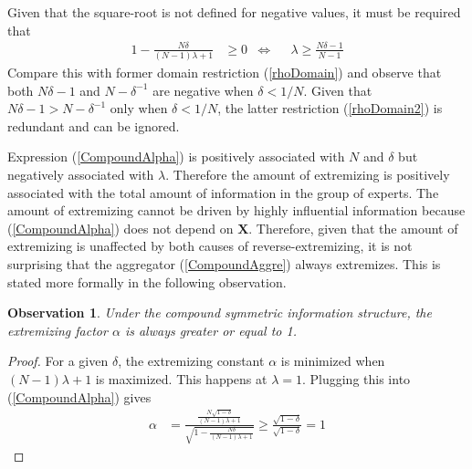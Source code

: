 \documentclass[11pt]{article}
\newtheorem{observation}[theorem]{Observation}
\theoremstyle{definition}
\theoremstyle{definition}
\begin{document}
Given that the square-root is not defined for negative values,  it must be required that
\begin{align}
1- \frac{N\delta}{(N-1)\lambda +1}  &\geq 0 &\Leftrightarrow&& \lambda \geq \frac{N\delta - 1}{N-1} \label{rhoDomain2}
\end{align}
Compare this with former domain restriction (\ref{rhoDomain}) and observe that both $N\delta - 1$ and $N - \delta^{-1}$ are negative when $\delta < 1/N$. Given that $N\delta - 1 > N - \delta^{-1}$ only when $\delta < 1/N$, the latter restriction (\ref{rhoDomain2}) is redundant and can be ignored. 

Expression (\ref{CompoundAlpha}) is positively associated with $N$ and $\delta$ but negatively associated with $\lambda$. Therefore the amount of extremizing is positively associated with the total amount of information in the group of experts. The amount of extremizing cannot be driven by highly influential information because (\ref{CompoundAlpha}) does not depend on $\boldsymbol{X}$. Therefore, given that the amount of extremizing is unaffected by both causes of reverse-extremizing, it is not surprising that the aggregator (\ref{CompoundAggre}) always extremizes. This is stated more formally in the following observation.

\begin{observation}
\label{positiveThm}
Under the compound symmetric information structure, the extremizing factor $\alpha$ is always greater or equal to 1. 
\end{observation}
\begin{proof} 
For a given $\delta$, the extremizing constant $\alpha$ is minimized when $(N-1)\lambda +1$ is maximized. This happens at $\lambda = 1$. Plugging this into (\ref{CompoundAlpha}) gives
\begin{align*}
\alpha &= \frac{\frac{N\sqrt{1-\delta}}{(N-1)\lambda +1}}{\sqrt{1- \frac{N\delta}{(N-1)\lambda +1} }}  \geq \frac{\sqrt{1-\delta}}{\sqrt{1-\delta }} = 1
\end{align*}
\end{proof}
\end{document}
